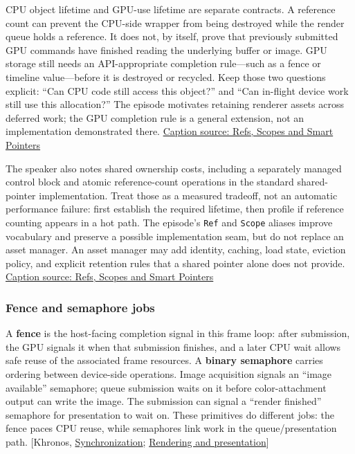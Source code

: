 CPU object lifetime and GPU-use lifetime are separate contracts. A reference count can prevent the CPU-side wrapper from being destroyed while the render queue holds a reference. It does not, by itself, prove that previously submitted GPU commands have finished reading the underlying buffer or image. GPU storage still needs an API-appropriate completion rule---such as a fence or timeline value---before it is destroyed or recycled. Keep those two questions explicit: ``Can CPU code still access this object?'' and ``Can in-flight device work still use this allocation?'' The episode motivates retaining renderer assets across deferred work; the GPU completion rule is a general extension, not an implementation demonstrated there. \href{https://www.youtube.com/watch?v=HkGZ378nArE}{Caption source: Refs, Scopes and Smart Pointers}

The speaker also notes shared ownership costs, including a separately managed control block and atomic reference-count operations in the standard shared-pointer implementation. Treat those as a measured tradeoff, not an automatic performance failure: first establish the required lifetime, then profile if reference counting appears in a hot path. The episode's \texttt{Ref} and \texttt{Scope} aliases improve vocabulary and preserve a possible implementation seam, but do not replace an asset manager. An asset manager may add identity, caching, load state, eviction policy, and explicit retention rules that a shared pointer alone does not provide. \href{https://www.youtube.com/watch?v=HkGZ378nArE}{Caption source: Refs, Scopes and Smart Pointers}

\subsubsection{Fence and semaphore jobs}\label{05-engine-i-ch014-fence-and-semaphore-jobs}

A \textbf{fence} is the host-facing completion signal in this frame loop: after submission, the GPU signals it when that submission finishes, and a later CPU wait allows safe reuse of the associated frame resources. A \textbf{binary semaphore} carries ordering between device-side operations. Image acquisition signals an ``image available'' semaphore; queue submission waits on it before color-attachment output can write the image. The submission can signal a ``render finished'' semaphore for presentation to wait on. These primitives do different jobs: the fence paces CPU reuse, while semaphores link work in the queue/presentation path. {[}Khronos, \href{https://docs.vulkan.org/guide/latest/synchronization.html}{Synchronization}; \href{https://docs.vulkan.org/tutorial/latest/03_Drawing_a_triangle/03_Drawing/02_Rendering_and_presentation.html}{Rendering and presentation}{]}


